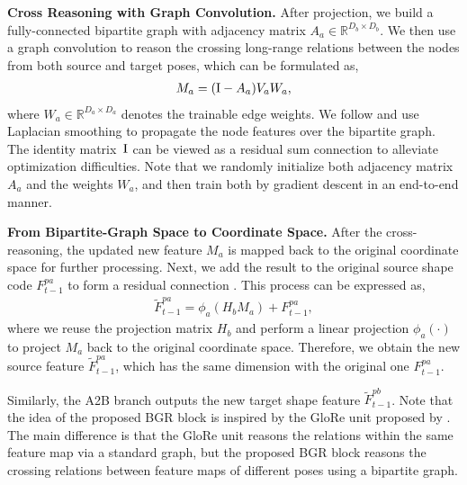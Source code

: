 \documentclass{bmvc2k}
\begin{document}
\noindent \textbf{Cross Reasoning with Graph Convolution.}
After projection, we build a fully-connected bipartite graph with adjacency matrix $A_a {\in} \mathbb{R}^{D_b \times D_b}$. 
We then use a graph convolution to reason the crossing long-range relations between the nodes from both source and target poses, which can be formulated as,
\begin{equation}
\begin{aligned}
M_a = ({\rm I} - A_a) V_a W_a,
\end{aligned}
\end{equation}
where $W_a {\in} \mathbb{R}^{D_a \times D_a}$ denotes the trainable edge weights.
We follow \cite{chen2019graph,zhang2019dual} and use Laplacian smoothing  \cite{chen2019graph,li2018deeper} to propagate the node features over the bipartite graph. 
The identity matrix~${\rm I}$ can be viewed as a residual sum connection to alleviate optimization difficulties. 
Note that we randomly initialize both adjacency matrix $A_a$ and the weights $W_a$, and then train both by gradient descent in an end-to-end manner.

\noindent \textbf{From Bipartite-Graph Space to Coordinate Space.}
After the cross-reasoning, the updated new feature $M_a$ is mapped back to the original coordinate space for further processing.
Next, we add the result to the original source shape code $F_{t-1}^{pa}$ to form a residual connection \cite{he2016deep}.
This process can be expressed as,
\begin{equation}
\begin{aligned}
\tilde{F}_{t-1}^{pa} = \phi_a(H_b M_a) + F_{t-1}^{pa},
\end{aligned}
\end{equation}
where we reuse the projection matrix $H_b$ and perform a linear projection
$\phi_a(\cdot)$ to project $M_a$ back to the original coordinate space. 
Therefore, we obtain the new source feature $\tilde{F}_{t-1}^{pa}$, which has the same dimension with the original one $F_{t-1}^{pa}$.

Similarly, the A2B branch outputs the new target shape feature $\tilde{F}_{t-1}^{pb}$. 
Note that the idea of the proposed BGR block is inspired by the GloRe unit proposed by \cite{chen2019graph}. 
The main difference is that the GloRe unit reasons the relations within the same feature map via a standard graph, but the proposed BGR block reasons the crossing relations between feature maps of different poses using a bipartite graph.
\end{document}
